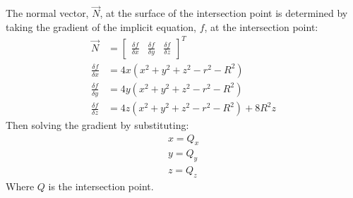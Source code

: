 The normal vector, $\vec{N}$, at the surface of the intersection point is 
determined by taking the gradient of the implicit equation, $f$, at the 
intersection point:
\begin{equation}
\begin{split}
  \vec{N} &= \begin{bmatrix} \frac{\delta f}{\delta x} & \frac{\delta f}{\delta
  y} & \frac{\delta f}{\delta z}
  \end{bmatrix}^{T} \\
  \frac{\delta f}{\delta x} &= 4x(x^2 + y^2 + z^2 - r^2 - R^2) \\
  \frac{\delta f}{\delta y} &= 4y(x^2 + y^2 + z^2 - r^2 - R^2) \\
  \frac{\delta f}{\delta z} &= 4z(x^2 + y^2 + z^2 - r^2 - R^2) + 8R^2z
\end{split}
\end{equation}
Then solving the gradient by substituting:
\begin{equation}
\begin{split}
  x = Q_{x} \\
  y = Q_{y} \\
  z = Q_{z}
\end{split}
\end{equation}
Where $Q$ is the intersection point.

